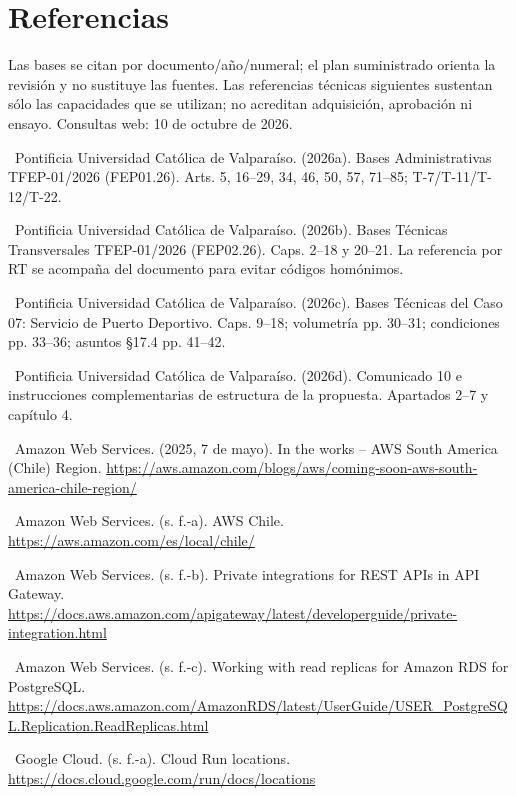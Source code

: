\documentclass[11pt,letterpaper]{report}
\begin{document}
\section*{Referencias}
Las bases se citan por documento/año/numeral; el plan suministrado orienta la revisión y no sustituye las fuentes. Las referencias técnicas siguientes sustentan sólo las capacidades que se utilizan; no acreditan adquisición, aprobación ni ensayo. Consultas web: 10 de octubre de 2026.

\noindent\textbullet\ Pontificia Universidad Católica de Valparaíso. (2026a). Bases Administrativas TFEP-01/2026 (FEP01.26). Arts. 5, 16--29, 34, 46, 50, 57, 71--85; T-7/T-11/T-12/T-22.\par
\noindent\textbullet\ Pontificia Universidad Católica de Valparaíso. (2026b). Bases Técnicas Transversales TFEP-01/2026 (FEP02.26). Caps. 2--18 y 20--21. La referencia por RT se acompaña del documento para evitar códigos homónimos.\par
\noindent\textbullet\ Pontificia Universidad Católica de Valparaíso. (2026c). Bases Técnicas del Caso 07: Servicio de Puerto Deportivo. Caps. 9--18; volumetría pp. 30--31; condiciones pp. 33--36; asuntos §17.4 pp. 41--42.\par
\noindent\textbullet\ Pontificia Universidad Católica de Valparaíso. (2026d). Comunicado 10 e instrucciones complementarias de estructura de la propuesta. Apartados 2--7 y capítulo 4.\par
\noindent\textbullet\ Amazon Web Services. (2025, 7 de mayo). In the works -- AWS South America (Chile) Region. \url{https://aws.amazon.com/blogs/aws/coming-soon-aws-south-america-chile-region/}\par
\noindent\textbullet\ Amazon Web Services. (s. f.-a). AWS Chile. \url{https://aws.amazon.com/es/local/chile/}\par
\noindent\textbullet\ Amazon Web Services. (s. f.-b). Private integrations for REST APIs in API Gateway. \url{https://docs.aws.amazon.com/apigateway/latest/developerguide/private-integration.html}\par
\noindent\textbullet\ Amazon Web Services. (s. f.-c). Working with read replicas for Amazon RDS for PostgreSQL. \url{https://docs.aws.amazon.com/AmazonRDS/latest/UserGuide/USER\_PostgreSQL.Replication.ReadReplicas.html}\par
\noindent\textbullet\ Google Cloud. (s. f.-a). Cloud Run locations. \url{https://docs.cloud.google.com/run/docs/locations}\par
\end{document}
